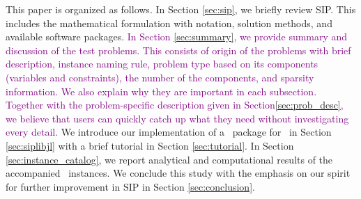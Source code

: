 This paper is organized as follows. In Section \ref{sec:sip}, we briefly review SIP. This includes the mathematical formulation with notation, solution methods, and available software packages. \textcolor{purple}{In Section \ref{sec:summary}, we provide summary and discussion of the test problems. This consists of origin of the problems with brief description, instance naming rule, problem type based on its components (variables and constraints), the number of the components, and sparsity information. We also explain why they are important in each subsection. Together with the problem-specific description given in Section\ref{sec:prob_desc}, we believe that users can quickly catch up what they need without investigating every detail. }We introduce our implementation of a \julia\ package for \siplibtwo\ in Section \ref{sec:siplibjl} with a brief tutorial in Section \ref{sec:tutorial}. In Section \ref{sec:instance_catalog}, we report analytical and computational results of the accompanied \smps\ instances. We conclude this study with the emphasis on our spirit for further improvement in SIP in Section \ref{sec:conclusion}. 







